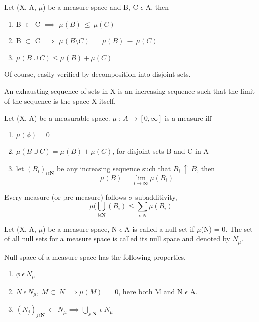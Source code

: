 \begin{lemma}
    Let (X, A, $\mu$) be a measure space and B, C $\epsilon$ A, then
    \begin{enumerate}
        \item B $\subset$ C $\implies$ $\mu(B) \: \leqslant \: \mu(C)$
        \item B $\subset$ C $\implies$ $\mu(B \setminus C) \: = \: \mu(B) \: - \:
            \mu(C)$
        \item $\mu(B \cup C) \leqslant \mu(B) + \mu(C)$
    \end{enumerate}
\end{lemma}
Of course, easily verified by decomposition into disjoint sets.
\begin{definition}
    An exhausting sequence of sets in X is an increasing sequence such that the
    limit of the sequence is the space X itself.
\end{definition}
\begin{theorem}
    Let (X, A) be a measurable space. $\mu \: : \: A \rightarrow [0,\infty]$ is
    a measure iff
    \begin{enumerate}
        \item $\mu(\phi) = 0$
        \item $\mu(B \cup C) = \mu(B) + \mu(C)$, for disjoint sets B and C in A
        \item let $(B_i)_{i \epsilon \bm{N}}$ be any increasing sequence such
            that $B_i \: \uparrow \: B$, then
            \[
                \mu(B) = \lim_{i \rightarrow \infty} \mu(B_i)
            \]
    \end{enumerate}
\end{theorem}
\begin{theorem}
    Every measure (or pre-measure) follows $\sigma$-subadditivity,
    \[
        \mu(\bigcup_{i \epsilon \bm{N}}(B_i) \leqslant \sum_{i \epsilon N}\mu(B_i)
    \]
\end{theorem}
\begin{definition}
    Let (X, A, $\mu$) be a measure space, N $\epsilon$ A is called a null set if
    $\mu$(N) = 0. The set of all null sets for a measure space is called its
    null space and denoted by $N_{\mu}$.
\end{definition}
\begin{lemma}
    Null space of a measure space has the following properties,
    \begin{enumerate}
        \item $\phi \: \epsilon \: N_{\mu}$
        \item $N \: \epsilon \: N_{\mu}, \: M \subset \: N \implies \mu(M) \: = \:
            0$, here both M and N $\epsilon$ A.
        \item $(N_j)_{j\epsilon\bm{N}} \: \subset \: N_\mu \implies
            \bigcup_{j\epsilon\bm{N}} \: \epsilon \: N_\mu$
    \end{enumerate}
\end{lemma}
